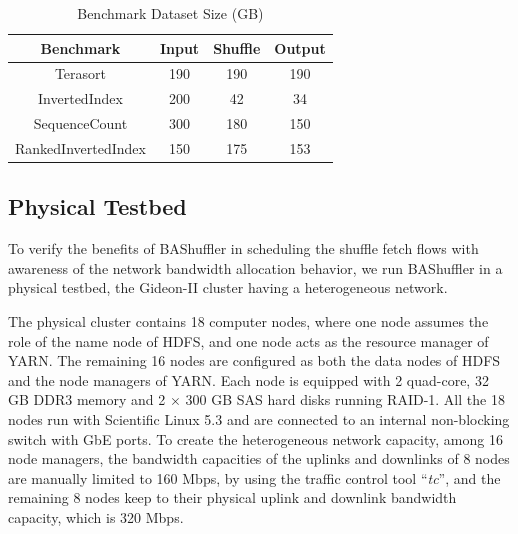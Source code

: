 \documentclass[10pt,journal,compsoc]{IEEEtran}
\begin{document}

\begin{table}[!t]
\renewcommand{\arraystretch}{1}
\caption{Benchmark Dataset Size (GB)}
\label{table:benchmark}
\centering
\begin{tabularx}{.4\textwidth}{c||c|c|c}
\hline
\textbf{Benchmark} & \textbf{Input} & \textbf{Shuffle} & \textbf{Output} \\
\hline
Terasort & 190 & 190 & 190\\
\hline
InvertedIndex & 200 & 42 & 34 \\
\hline
SequenceCount & 300 & 180 & 150 \\
\hline
RankedInvertedIndex & 150 & 175 & 153\\
\hline
\end{tabularx}
\end{table}

\subsection{Physical Testbed}
To verify the benefits of BAShuffler in scheduling the shuffle fetch
flows with awareness of the network bandwidth allocation behavior,
we run BAShuffler in a physical testbed, the
Gideon-II cluster \cite{gideon} having a heterogeneous network.


The physical cluster contains 18 computer nodes, where one node
assumes the role of the name node of HDFS, and
one node acts as the resource manager of YARN. 
The remaining 16 nodes are configured as both the data nodes of HDFS
and the node managers of YARN.
Each node is equipped with 2 quad-core, 32 GB DDR3 memory and
2 $\times$ 300 GB SAS hard disks running RAID-1. 
All the 18 nodes run with Scientific Linux 5.3 and are connected to an internal non-blocking switch with GbE ports. 
To create the heterogeneous network capacity, among 16 node managers, 
the bandwidth capacities of the uplinks and downlinks of 8 nodes are
manually limited to 160 Mbps,
by using the traffic control tool ``\emph{tc}'', 
and the remaining 8 nodes keep to their physical uplink and downlink
bandwidth capacity, which is 320 Mbps.
\end{document}
